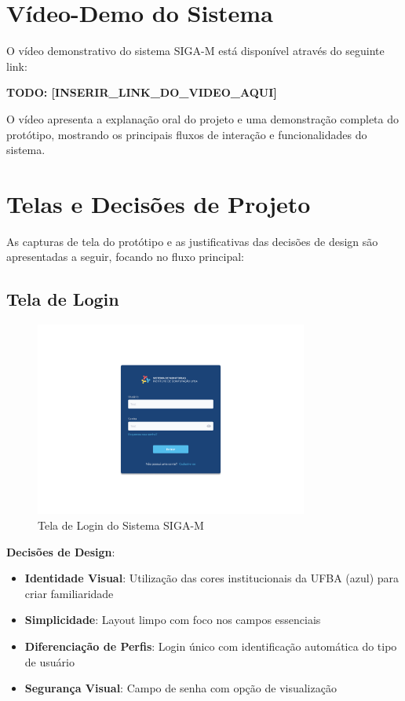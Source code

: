 \documentclass[12pt, a4paper]{report}
\begin{document}
\section{Vídeo-Demo do Sistema}

O vídeo demonstrativo do sistema SIGA-M está disponível através do seguinte link:

\textbf{TODO: [INSERIR\_LINK\_DO\_VIDEO\_AQUI]}

O vídeo apresenta a explanação oral do projeto e uma demonstração completa do protótipo, mostrando os principais fluxos de interação e funcionalidades do sistema.

\section{Telas e Decisões de Projeto}

As capturas de tela do protótipo e as justificativas das decisões de design são apresentadas a seguir, focando no fluxo principal:

\subsection{Tela de Login}

\begin{figure}[H]
\centering
\includegraphics[width=0.8\textwidth]{figma/Login.png}
\caption{Tela de Login do Sistema SIGA-M}
\label{fig:login}
\end{figure}

\textbf{Decisões de Design}:
\begin{itemize}
    \item \textbf{Identidade Visual}: Utilização das cores institucionais da UFBA (azul) para criar familiaridade
    \item \textbf{Simplicidade}: Layout limpo com foco nos campos essenciais
    \item \textbf{Diferenciação de Perfis}: Login único com identificação automática do tipo de usuário
    \item \textbf{Segurança Visual}: Campo de senha com opção de visualização
\end{itemize}
\end{document}

